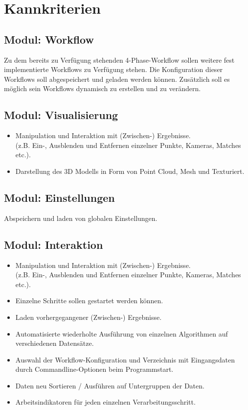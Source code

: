 \section{Kannkriterien}
\subsection{Modul: Workflow}
Zu dem bereits zu Verfügung stehenden 4-Phase-Workflow sollen weitere fest implementierte Workflows zu Verfügung stehen. Die Konfiguration dieser Workflows soll abgespeichert und geladen werden können. Zusätzlich soll es möglich sein Workflows dynamisch zu erstellen und zu verändern. 
\subsection{Modul: Visualisierung}

\begin{itemize}
	\item Manipulation und Interaktion mit (Zwischen-) Ergebnisse.\\(z.B. Ein-, Ausblenden und Entfernen einzelner Punkte, Kameras, Matches etc.).
	\item Darstellung des 3D Modells in Form von Point Cloud, Mesh und Texturiert.
\end{itemize}
\subsection{Modul: Einstellungen}
Abspeichern und laden von globalen Einstellungen.
\subsection{Modul: Interaktion}
\begin{itemize}
	\item Manipulation und Interaktion mit (Zwischen-) Ergebnisse.\\(z.B. Ein-, Ausblenden und Entfernen einzelner Punkte, Kameras, Matches etc.).
	\item Einzelne Schritte sollen gestartet werden können.
	\item Laden vorhergegangener (Zwischen-) Ergebnisse.
	\item Automatisierte wiederholte Ausführung von einzelnen Algorithmen auf verschiedenen Datensätze.
	\item Auswahl der Workflow-Konfiguration und Verzeichnis mit Eingangsdaten durch Commandline-Optionen beim Programmstart.
	\item Daten neu Sortieren / Ausführen auf Untergruppen der Daten.
	\item Arbeitsindikatoren für jeden einzelnen Verarbeitungsschritt.
\end{itemize}


